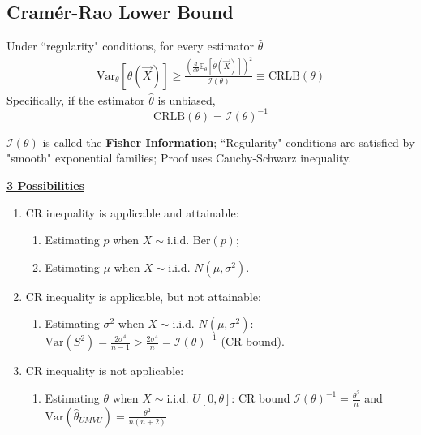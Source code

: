 \documentclass[11pt]{elegantbook}
\begin{document}
\subsection{Cramér-Rao Lower Bound}


\begin{proposition}
    Under ``regularity" conditions, for every estimator $\hat{\theta}$
    \begin{equation}
        \begin{aligned}
            \text{Var}_\theta[\hat{\theta}(\vec{X})]\geq \frac{\left(\frac{d}{d\theta}\mathbb{E}_\theta[\hat{\theta}(\vec{X})]\right)^2}{\mathcal{I}(\theta)}\equiv \text{CRLB}(\theta)
        \end{aligned}
        \nonumber
    \end{equation}
    Specifically, if the estimator $\hat{\theta}$ is unbiased, $$\text{CRLB}(\theta)=\mathcal{I}(\theta)^{-1}$$
\end{proposition}
\begin{remark}
    $\mathcal{I}(\theta)$ is called the \textbf{Fisher Information}; ``Regularity" conditions are satisfied by "smooth" exponential families; Proof uses Cauchy-Schwarz inequality.
\end{remark}
\textbf{\underline{3 Possibilities}}
\begin{enumerate}[(1).]
    \item CR inequality is applicable and attainable:
    \begin{enumerate}
        \item Estimating $p$ when $X\sim \text{i.i.d. Ber}(p)$;
        \item Estimating $\mu$ when $X\sim \text{i.i.d. } N(\mu,\sigma^2)$.
    \end{enumerate}
    \item CR inequality is applicable, but not attainable:
    \begin{enumerate}
        \item Estimating $\sigma^2$ when $X\sim \text{i.i.d. } N(\mu,\sigma^2)$: $\text{Var}(S^2)=\frac{2\sigma^4}{n-1}>\frac{2\sigma^4}{n}=\mathcal{I}(\theta)^{-1}$ (CR bound).
    \end{enumerate}
    \item CR inequality is not applicable:
    \begin{enumerate}
        \item Estimating $\theta$ when $X\sim \text{i.i.d. }U[0,\theta]$: CR bound $\mathcal{I}(\theta)^{-1}=\frac{\theta^2}{n}$ and $\text{Var}(\hat{\theta}_{UMVU})=\frac{\theta^2}{n(n+2)}$
    \end{enumerate}
\end{enumerate}
\end{document}
